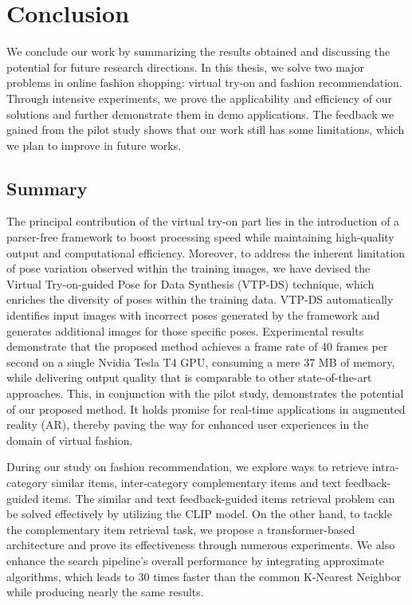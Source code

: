 \chapter{Conclusion}
\label{chapter-conclusion}
\begin{ChapAbstract}
We conclude our work by summarizing the results obtained and discussing the potential for future research directions. In this thesis, we solve two major problems in online fashion shopping: virtual try-on and fashion recommendation. Through intensive experiments, we prove the applicability and efficiency of our solutions and further demonstrate them in demo applications. The feedback we gained from the pilot study shows that our work still has some limitations, which we plan to improve in future works.
\end{ChapAbstract}

\section{Summary}

The principal contribution of the virtual try-on part lies in the introduction of a parser-free framework to boost processing speed while maintaining high-quality output and computational efficiency. Moreover, to address the inherent limitation of pose variation observed within the training images, we have devised the Virtual Try-on-guided Pose for Data Synthesis (VTP-DS) technique, which enriches the diversity of poses within the training data. VTP-DS automatically identifies input images with incorrect poses generated by the framework and generates additional images for those specific poses. Experimental results demonstrate that the proposed method achieves a frame rate of 40 frames per second on a single Nvidia Tesla T4 GPU, consuming a mere 37 MB of memory, while delivering output quality that is comparable to other state-of-the-art approaches. This, in conjunction with the pilot study, demonstrates the potential of our proposed method. It holds promise for real-time applications in augmented reality (AR), thereby paving the way for enhanced user experiences in the domain of virtual fashion.

During our study on fashion recommendation, we explore ways to retrieve intra-category similar items, inter-category complementary items and text feedback-guided items. The similar and text feedback-guided items retrieval problem can be solved effectively by utilizing the CLIP model. On the other hand, to tackle the complementary item retrieval task, we propose a transformer-based architecture and prove its effectiveness through numerous experiments. We also enhance the search pipeline's overall performance by integrating approximate algorithms, which leads to 30 times faster than the common K-Nearest Neighbor while producing nearly the same results.

